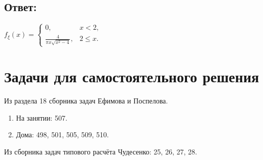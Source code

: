 \subsection*{Ответ:}
$
f_\xi(x)
= \left \{
\begin{array}{ll}
    0,                              & x < 2 ,   \\
    \frac{4}{\pi x \sqrt{x^2 - 4}}, & 2 \le x .
\end{array}
\right .
$

\section*{Задачи для самостоятельного решения}

Из раздела 18 сборника задач Ефимова и Поспелова.
\begin{enumerate}
    \item На занятии: 507.
    \item Дома: 498, 501, 505, 509, 510.
\end{enumerate}

Из сборника задач типового расчёта Чудесенко: 25, 26, 27, 28.